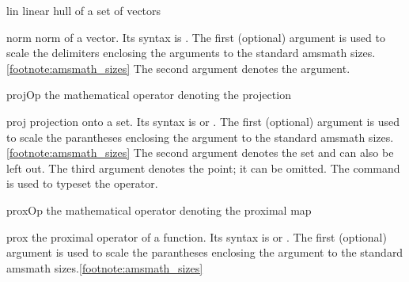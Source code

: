 \documentclass[english,a4paper,DIV=12,parskip=full,oneside]{scrartcl}
\begin{document}
\begin{commandlist}
        \item[lin] linear hull of a set of vectors 
        \item[norm] norm of a vector.
            Its syntax is .
            The first (optional) argument is used to scale the delimiters enclosing the arguments to the standard amsmath sizes.\cref{footnote:amsmath_sizes}
            The second argument denotes the argument.
            \par{}
            \par{}
            \par{}
        \item[projOp] the mathematical operator denoting the projection \mathCodeExample{\projOp}
            \par\mathCodeExample{\projOp}
        \item[proj] projection onto a set.
            Its syntax is  or .
            The first (optional) argument is used to scale the parantheses enclosing the argument to the standard amsmath sizes.\cref{footnote:amsmath_sizes}
            The second argument denotes the set and can also be left out.
            The third argument denotes the point; it can be omitted.
            The command \codeCommand{\projOp} is used to typeset the operator.
            \par\mathCodeExample{\proj}
            \par{}
            \par\mathCodeExample{\proj{\cC}}
            \par{}
            \par{}
            \par{}
        \item[proxOp] the mathematical operator denoting the proximal map
            \par\mathCodeExample{\proxOp}
        \item[prox] the proximal operator of a function.
            Its syntax is  or .
            The first (optional) argument is used to scale the parantheses enclosing the argument to the standard amsmath sizes.\cref{footnote:amsmath_sizes}

\end{commandlist}
\end{document}
